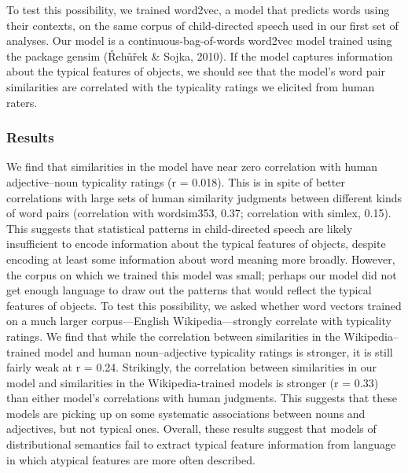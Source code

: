 \documentclass[10pt, letterpaper]{article}
\begin{document}
To test this possibility, we trained word2vec, a model that predicts
words using their contexts, on the same corpus of child-directed speech
used in our first set of analyses. Our model is a
continuous-bag-of-words word2vec model trained using the package gensim
(Řehůřek \& Sojka, 2010). If the model captures information about the
typical features of objects, we should see that the model's word pair
similarities are correlated with the typicality ratings we elicited from
human raters.

\hypertarget{results-1}{%
\subsubsection{Results}\label{results-1}}

We find that similarities in the model have near zero correlation with
human adjective--noun typicality ratings (r = 0.018). This is in spite
of better correlations with large sets of human similarity judgments
between different kinds of word pairs (correlation with wordsim353,
0.37; correlation with simlex, 0.15). This suggests that statistical
patterns in child-directed speech are likely insufficient to encode
information about the typical features of objects, despite encoding at
least some information about word meaning more broadly. However, the
corpus on which we trained this model was small; perhaps our model did
not get enough language to draw out the patterns that would reflect the
typical features of objects. To test this possibility, we asked whether
word vectors trained on a much larger corpus---English
Wikipedia---strongly correlate with typicality ratings. We find that
while the correlation between similarities in the Wikipedia--trained
model and human noun--adjective typicality ratings is stronger, it is
still fairly weak at r = 0.24. Strikingly, the correlation between
similarities in our model and similarities in the Wikipedia-trained
models is stronger (r = 0.33) than either model's correlations with
human judgments. This suggests that these models are picking up on some
systematic associations between nouns and adjectives, but not typical
ones. Overall, these results suggest that models of distributional
semantics fail to extract typical feature information from language in
which atypical features are more often described.
\end{document}
